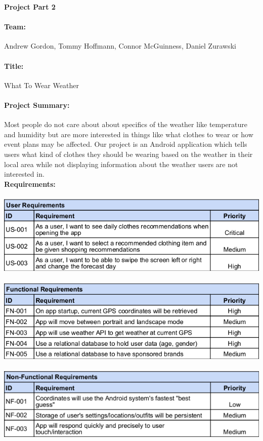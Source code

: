 \documentclass[12pt,a4paper]{article}
\begin{document}

\noindent\textbf{Project Part 2}

\paragraph{Team:}Andrew Gordon, Tommy Hoffmann, Connor McGuinness, Daniel Zurawski

\paragraph{Title:}What To Wear Weather

\paragraph{Project Summary:}Most people do not care about about specifics of the weather like
temperature and humidity but are more interested in things like what clothes to wear or how
event plans may be affected. Our project is an Android application which tells users what kind
of clothes they should be wearing based on the weather in their local area while not displaying
information about the weather users are not interested in.
\\

\noindent\textbf{Requirements:}
\\\\
\includegraphics[scale=0.7]{user.png}\\\\
\includegraphics[scale=0.7]{functional.png}\\\\
\includegraphics[scale=0.7]{non-functional.png}\\\\
\end{document}
